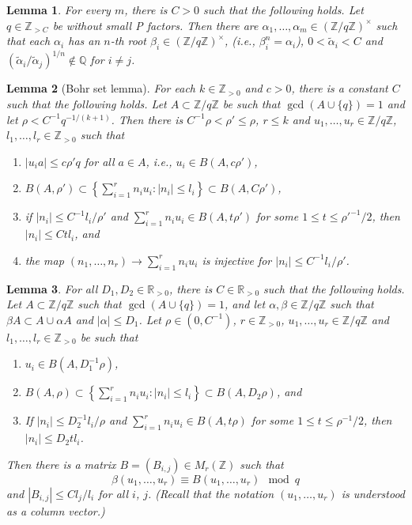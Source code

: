 \documentclass[10pt,a4paper]{amsart}
\newtheorem{lemma}{Lemma}
\newcommand{\Q}{\mathbb{Q}}
\newcommand{\R}{\mathbb{R}}
\newcommand{\Z}{\mathbb{Z}}
\newcommand{\wt}{\widetilde}
\begin{document}
\begin{lemma}
\label{lem:Enough residues}For every $m$, there is $C>0$ such that the following holds.
Let $q\in \Z_{>C}$ be without small P factors.
Then there
are $\alpha_{1},\ldots,\alpha_{m}\in(\Z/q\Z)^{\times}$ such that each
$\alpha_{i}$ has an $n$-th root $\beta_{i}\in(\Z/q\Z)^\times$, (i.e., $\beta_{i}^{n}=\alpha_{i}$),
$0<\wt\alpha_{i}<C$ and  $(\wt\alpha_{i}/\wt\alpha_{j})^{1/n}\notin\Q$ for $i\ne j$.
\end{lemma}

\begin{lemma}[Bohr set lemma]
\label{lem:Bohr Set Lemma}
For each $k\in\Z_{>0}$ and $c>0$, there is a constant $C$ such that 
the following holds.
Let $A\subset\Z/q\Z$ be such that $\gcd(A\cup\{q\})=1$
and let $\rho<C^{-1}q^{-1/(k+1)}$.
Then there is $C^{-1}\rho<\rho'\le\rho$,
$r\le k$ and $u_{1},\ldots,u_{r}\in\Z/q\Z$, $l_{1},\ldots,l_{r}\in\Z_{>0}$
such that
\begin{enumerate}
\item $|u_{i}a|\le c\rho'q$ for all $a\in A$, i.e., $u_{i}\in B(A,c\rho')$,
\item $B(A,\rho')\subset\left\{ \sum_{i=1}^{r}n_{i}u_{i}:|n_{i}|\le l_{i}\right\} \subset B(A,C\rho')$,
\item if $\left|n_{i}\right|\le C^{-1}l_{i}/\rho'$ and $\sum_{i=1}^{r}n_{i}u_{i}\in B(A,t\rho')$
for some $1\le t\le{\rho'}^{-1}/2$, then $\left|n_{i}\right|\le Ctl_{i}$, and
\item the map $(n_{1},\ldots,n_{r})\to\sum_{i=1}^{r}n_{i}u_{i}$ is injective
for $\left|n_{i}\right|\le C^{-1}l_{i}/\rho'$.
\end{enumerate}
\end{lemma}

\begin{lemma}\label{lem:lifting beta}
For all $D_1,D_2\in \R_{>0}$, there is $C\in \R_{>0}$ such that the following holds.
Let $A\subset\Z/q\Z$ such that $\gcd(A\cup\{q\})=1$, and let $\alpha,\beta\in\Z/q\Z$
such that $\beta A\subset A\cup \alpha A$ and $|\alpha|\le D_1$.
Let $\rho\in(0,C^{-1})$, $r\in\Z_{>0}$, $u_1,\ldots,u_r\in\Z/q\Z$
and $l_1,\ldots, l_r\in\Z_{>0}$ be such that
\begin{enumerate}
\item $u_{i}\in B(A,D_1^{-1}\rho)$,
\item $B(A,\rho)\subset\left\{ \sum_{i=1}^{r}n_{i}u_{i}:|n_{i}|\le l_{i}\right\} \subset B(A,D_2\rho)$, and
\item If $\left|n_{i}\right|\le D_2^{-1}l_{i}/\rho$ and $\sum_{i=1}^{r}n_{i}u_{i}\in B(A,t\rho)$
for some $1\le t\le{\rho}^{-1}/2$, then $\left|n_{i}\right|\le D_2tl_{i}$.
\end{enumerate}

Then there is a matrix $B=(B_{i,j})\in M_r(\Z)$ such that
\[
\beta (u_1,\ldots, u_r)\equiv B(u_1,\ldots,u_r) \mod q
\]
and $|B_{i,j}|\le C l_j/l_i$ for all $i$, $j$.
(Recall that the notation $(u_1,\ldots,u_r)$ is understood as a column vector.)
\end{lemma} 
\end{document}
